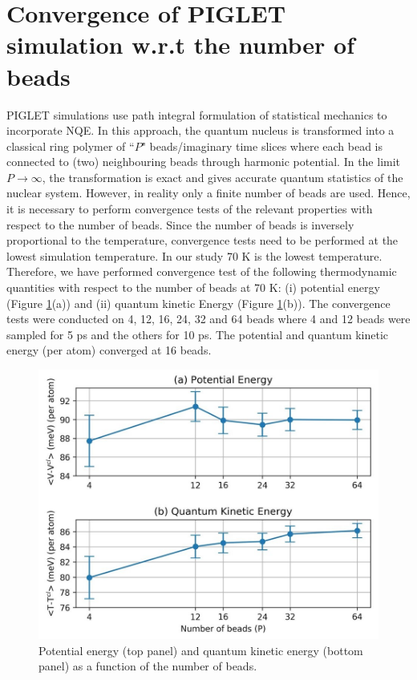 \section{Convergence of PIGLET simulation w.r.t the number of beads}
\label{convergence_si}
PIGLET simulations use path integral formulation of statistical mechanics to incorporate NQE. In this approach, the quantum nucleus is transformed into a classical ring polymer of ``$P$" beads/imaginary time slices where each bead is connected to (two) neighbouring beads through harmonic potential. In the limit $P \rightarrow  \infty$,  the transformation is exact and gives accurate quantum statistics of the nuclear system. However, in reality only a finite number of beads are used. Hence, it is
necessary to perform convergence tests of the relevant properties with respect to the number of beads.
Since the number of beads is inversely proportional to the temperature, convergence tests 
need to be performed at the lowest simulation temperature. In our study 70 K is the lowest temperature. Therefore, we have performed convergence test of the following thermodynamic quantities with respect to the number of beads at 70 K:
(i) potential energy (Figure \ref{fig:cip7}(a)) and (ii) quantum kinetic Energy (Figure 
\ref{fig:cip7}(b)). The convergence tests were conducted on 4, 12, 16, 24, 32 and 64 beads where 4 and
12 beads were sampled for 5 ps and the others for 10 ps. The potential and quantum kinetic energy 
(per atom) converged at 16 beads. 

\begin{figure}
    \centering
    \includegraphics[width=15cm ]{./Appendix4/new_figures_si/figure7.jpg}
    \caption{ Potential energy (top panel) and quantum kinetic energy (bottom panel) as a function of the number of beads.}
    \label{fig:cip7}
\end{figure}

